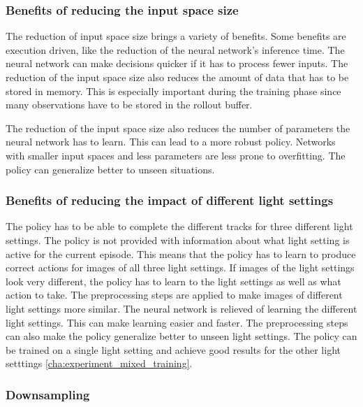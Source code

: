 \subsubsection*{Benefits of reducing the input space size}

The reduction of input space size brings a variety of benefits. Some benefits are execution driven, like the reduction of the neural network's inference time. The neural network can make decisions quicker if it has to process fewer inputs. The reduction of the input space size also reduces the amount of data that has to be stored in memory. This is especially important during the training phase since many observations have to be stored in the rollout buffer.

The reduction of the input space size also reduces the number of parameters the neural network has to learn. This can lead to a more robust policy. Networks with smaller input spaces and less parameters are less prone to overfitting. The policy can generalize better to unseen situations.


\subsubsection*{Benefits of reducing the impact of different light settings}

The policy has to be able to complete the different tracks for three different light settings. The policy is not provided with information about what light setting is active for the current episode. This means that the policy has to learn to produce correct actions for images of all three light settings. If images of the light settings look very different, the policy has to learn to the light settings as well as what action to take.
The preprocessing steps are applied to make images of different light settings more similar. The neural network is relieved of learning the different light settings. This can make learning easier and faster.
The preprocessing steps can also make the policy generalize better to unseen light settings. The policy can be trained on a single light setting and achieve good results for the other light setttings \ref{cha:experiment_mixed_training}.



\subsubsection{Downsampling}

